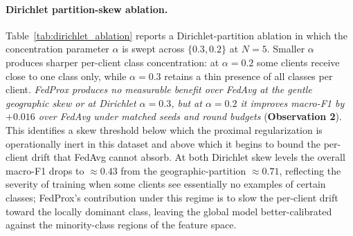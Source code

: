\documentclass[conference]{IEEEtran}
\begin{document}
\paragraph{Dirichlet partition-skew ablation.}
Table~\ref{tab:dirichlet_ablation} reports a Dirichlet-partition ablation in which the concentration parameter $\alpha$ is swept across $\{0.3, 0.2\}$ at $N=5$. Smaller $\alpha$ produces sharper per-client class concentration: at $\alpha = 0.2$ some clients receive close to one class only, while $\alpha = 0.3$ retains a thin presence of all classes per client. \textit{FedProx produces no measurable benefit over FedAvg at the gentle geographic skew or at Dirichlet $\alpha = 0.3$, but at $\alpha = 0.2$ it improves macro-F1 by $+0.016$ over FedAvg under matched seeds and round budgets} (\textbf{Observation 2}). This identifies a skew threshold below which the proximal regularization is operationally inert in this dataset and above which it begins to bound the per-client drift that FedAvg cannot absorb. At both Dirichlet skew levels the overall macro-F1 drops to $\approx 0.43$ from the geographic-partition $\approx 0.71$, reflecting the severity of training when some clients see essentially no examples of certain classes; FedProx's contribution under this regime is to slow the per-client drift toward the locally dominant class, leaving the global model better-calibrated against the minority-class regions of the feature space.

\begin{table}[!htbp]
\centering
\caption{Dirichlet partition-skew ablation at $N=5$ across two concentration parameters. Mean macro-F1 and accuracy over the last 10 of 50 rounds. $\Delta$ row is the FedProx-minus-FedAvg gap on each $\alpha$ column. Lower $\alpha$ produces sharper per-client class skew.}
\label{tab:dirichlet_ablation}
\small
\setlength{\tabcolsep}{4pt}
\end{table}
\end{document}
